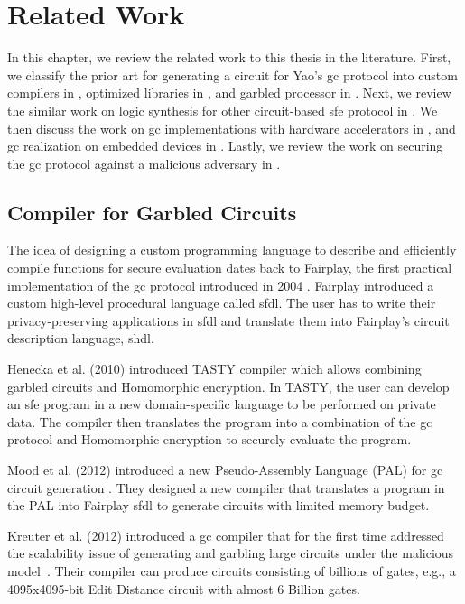 \chapter{Related Work}\label{chap:related}
In this chapter, we review the related work to this thesis in the literature.
First, we classify the prior art for generating a circuit for Yao's \acrfull{gc} protocol into custom compilers in , optimized libraries in , and garbled processor in .
Next, we review the similar work on logic synthesis for other circuit-based \acrfull{sfe} protocol in .
We then discuss the work on \acrshort{gc} implementations with hardware accelerators in , and \acrshort{gc} realization on embedded devices in .
Lastly, we review the work on securing the \acrshort{gc} protocol against a malicious adversary in .

\section{Compiler for Garbled Circuits}\label{sec:related-compiler}
The idea of designing a custom programming language to describe and efficiently compile functions for secure evaluation dates back to Fairplay, the first practical implementation of the \acrshort{gc} protocol introduced in 2004 \cite{malkhi2004fairplay}.
Fairplay introduced a custom high-level procedural language called \acrfull{sfdl}.
The user has to write their privacy-preserving applications in \acrshort{sfdl} and translate them into Fairplay's circuit description language, \acrfull{shdl}.

Henecka et al. (2010) introduced TASTY compiler \cite{henecka2010tasty} which allows combining garbled circuits and Homomorphic encryption.
In TASTY, the user can develop an \acrshort{sfe} program in a new domain-specific language to be performed on private data.
The compiler then translates the program into a combination of the \acrshort{gc} protocol and Homomorphic encryption to securely evaluate the program.

Mood et al. (2012) introduced a new Pseudo-Assembly Language (PAL) for \acrshort{gc} circuit generation \cite{mood2012memory}.
They designed a new compiler that translates a program in the PAL into Fairplay \acrshort{sfdl} to generate circuits with limited memory budget.

Kreuter et al. (2012) introduced a \acrshort{gc} compiler that for the first time addressed the scalability issue of generating and garbling large circuits under the malicious model~\cite{kreuter2012billion}.
Their compiler can produce circuits consisting of billions of gates, e.g., a 4095x4095-bit Edit Distance circuit with almost 6 Billion gates.

